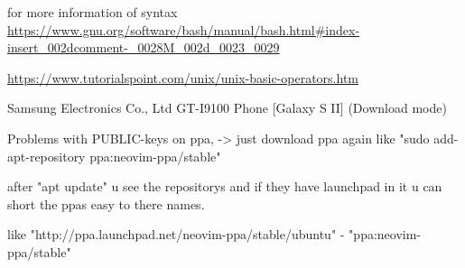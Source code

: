 \documentclass[12pt]{article}
\begin{document}
for more information of syntax
{\url{https://www.gnu.org/software/bash/manual/bash.html#index-insert_002dcomment-_0028M_002d_0023_0029}}

{\url{https://www.tutorialspoint.com/unix/unix-basic-operators.htm}}

Samsung Electronics Co., Ltd GT-I9100 Phone [Galaxy S II] (Download mode)

Problems with PUBLIC-keys on ppa, -> just download ppa again like "sudo add-apt-repository ppa:neovim-ppa/stable" 

after "apt update" u see the repositorys and if they have launchpad in it u can short the ppas easy to there names. 

like "http://ppa.launchpad.net/neovim-ppa/stable/ubuntu" - "ppa:neovim-ppa/stable"
\end{document}
